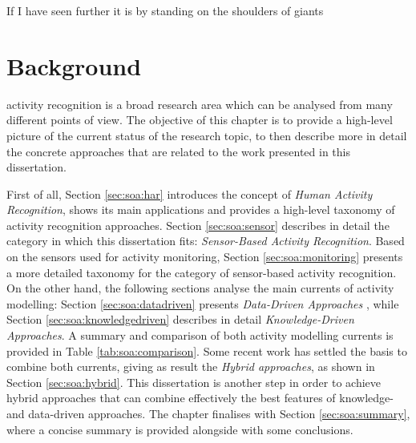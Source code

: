 

\begin{savequote}[50mm]
If I have seen further it is by standing on the shoulders of giants
\end{savequote}

\chapter{Background}
\label{cha:soa}

\ifpdf
    \graphicspath{{2_state_of_the_art/figures/PDF/}{2_state_of_the_art/figures/PNG/}{2_state_of_the_art/figures/}}
\else
    \graphicspath{{2_state_of_the_art/figures/EPS/}{2_state_of_the_art/figures/}}
\fi


 activity recognition is a broad research area which can be analysed from many different points of view. The objective of this chapter is to provide a high-level picture of the current status of the research topic, to then describe more in detail the concrete approaches that are related to the work presented in this dissertation. 

First of all, Section \ref{sec:soa:har} introduces the concept of \textit{Human Activity Recognition}, shows its main applications and provides a high-level taxonomy of activity recognition approaches. Section \ref{sec:soa:sensor} describes in detail the category in which this dissertation fits: \textit{Sensor-Based Activity Recognition}. Based on the sensors used for activity monitoring, Section \ref{sec:soa:monitoring} presents a more detailed taxonomy for the category of sensor-based activity recognition. On the other hand, the following sections analyse the main currents of activity modelling: Section \ref{sec:soa:datadriven} presents \textit{Data-Driven Approaches} , while Section \ref{sec:soa:knowledgedriven} describes in detail \textit{Knowledge-Driven Approaches}. A summary and comparison of both activity modelling currents is provided in Table \ref{tab:soa:comparison}. Some recent work has settled the basis to combine both currents, giving as result the \textit{Hybrid approaches}, as shown in Section \ref{sec:soa:hybrid}. This dissertation is another step in order to achieve hybrid approaches that can combine effectively the best features of knowledge- and data-driven approaches. The chapter finalises with Section \ref{sec:soa:summary}, where a concise summary is provided alongside with some conclusions.